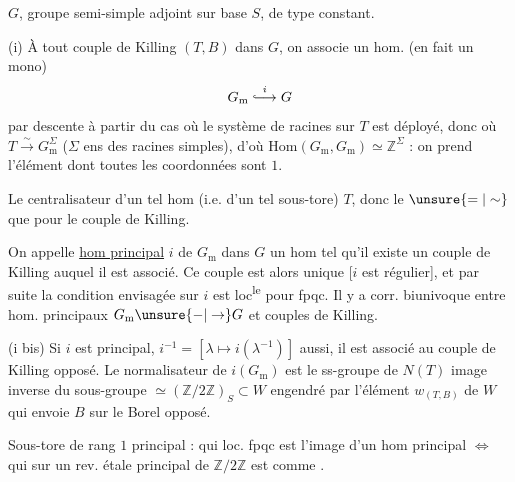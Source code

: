 $G$, groupe semi-simple adjoint sur base $S$, de type constant.

(i) À tout couple de Killing $(T,B)$ dans $G$, on associe un hom. (en fait un mono)
\[
G_{\mathrm m}\overset{i}{\lhook\joinrel\longrightarrow}G
\]
par descente à partir du cas où le système de racines sur $T$ est déployé, donc où $T\xrightarrow{\sim}G_{\mathrm m}^{\Sigma}$ ($\Sigma$ ens des racines simples),  d'où $\mathrm{Hom}(G_{\mathrm m},G_{\mathrm m})\simeq\mathbb Z^{\Sigma}$ : on prend l'élément dont toutes les coordonnées sont $1$.

Le centralisateur d'un tel hom (i.e. d'un tel sous-tore)  $T$, donc le $\unsure{=|\sim}$ que pour le couple de Killing.

On appelle \uline{hom principal} $i$ de $G_{\mathrm m}$ dans $G$ un hom tel qu'il existe un couple de Killing auquel il est associé. Ce couple est alors unique [$i$ est régulier], et par suite la condition envisagée sur $i$ est loc\textsuperscript{le} pour fpqc. Il y a corr. biunivoque entre hom. principaux $G_{\mathrm m}\unsure{-|\to}G$ et couples de Killing.

(i bis)  Si $i$ est principal, $i^{-1}=[\lambda\mapsto i(\lambda^{-1})]$ aussi, il est associé au couple de Killing opposé. Le normalisateur de $i(G_{\mathrm m})$ est le ss-groupe de $N(T)$ image inverse du sous-groupe $\simeq(\mathbb Z/2\mathbb Z)_S\subset W$ engendré par l'élément $w_{(T,B)}$ de $W$ qui envoie $B$ sur le Borel opposé.

Sous-tore de rang $1$ principal : qui loc. fpqc est l'image d'un hom principal $\Longleftrightarrow$ qui sur un rev. étale  principal de  $\mathbb Z/2\mathbb Z$ est comme .

